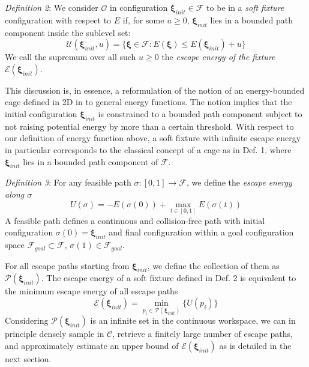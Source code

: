 \documentclass[conference]{IEEEtran}
\newcommand{\bxi}{\boldsymbol{\xi}}
\begin{document}
\textit{Definition 2}: 
We consider $\mathcal{O}$ in configuration $\boldsymbol{\xi}_{init}\in \mathcal{F}$ to be in a \textit{soft fixture} configuration with respect to $E$ if, for some $u\ge 0$, $\boldsymbol{\xi}_{init}$ lies in a bounded path component inside the sublevel set:
\begin{equation} \label{eq3}
	\mathcal{U}(\bxi_{init}, u) = \{ \bxi \in \mathcal{F} : E(\bxi)\le E(\bxi_{init})+u \}
\end{equation}
We call the supremum over all such $u\ge 0$ the \textit{escape energy of the fixture} $\mathcal{E}(\bxi_{init})$.

This discussion is, in essence, a reformulation of the notion of an energy-bounded cage defined in 2D in \cite{b12, b13} to general energy functions.
The notion implies that the initial configuration $\boldsymbol{\xi}_{init}$ is constrained to a bounded path component subject to not raising potential energy by more than a certain threshold. 
With respect to our definition of energy function above, a soft fixture with infinite escape energy in particular corresponds to the classical concept of a cage as in Def. 1, where $\boldsymbol{\xi}_{init}$ lies in a bounded path component of $\mathcal{F}$.

\textit{Definition 3}:
For any feasible path $\sigma:[0, 1]\to \mathcal{F}$, we define 
the \textit{escape energy along $\sigma$}
\begin{equation} \label{eq4}
	U(\sigma)= -E(\sigma(0)) + \max_{t\in[0, 1]} E(\sigma(t))
\end{equation}
A feasible path defines a continuous and collision-free path with initial configuration $\sigma(0) = \bxi_{init}$ and final configuration within a goal configuration space $\mathcal{F}_{goal} \subset \mathcal{F}$, $\sigma(1) \in \mathcal{F}_{goal}$.

For all escape paths starting from $\bxi_{init}$, we define the collection of them as $\mathcal{P}(\bxi_{init})$. 
The escape energy of a soft fixture defined in Def. 2 is equivalent to the minimum escape energy of all escape paths
\begin{equation} \label{eq5}
	\mathcal{E}(\bxi_{init}) = \min\limits_{p_i \in \mathcal{P}(\bxi_{init})} \{ U(p_i) \}
\end{equation}
Considering $\mathcal{P}(\bxi_{init})$ is an infinite set in the continuous workspace, we can in principle densely sample in $\mathcal{C}$, retrieve a finitely large number of escape paths, and approximately estimate an upper bound of $\mathcal{E}(\bxi_{init})$ as is detailed in the next section.
\end{document}
